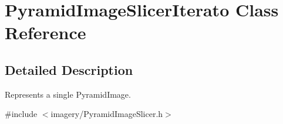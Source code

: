 \hypertarget{class_pyramid_image_slicer_iterato}{}\section{Pyramid\+Image\+Slicer\+Iterato Class Reference}
\label{class_pyramid_image_slicer_iterato}


\subsection{Detailed Description}
Represents a single Pyramid\+Image. 

{\ttfamily \#include $<$imagery/\+Pyramid\+Image\+Slicer.\+h$>$}

